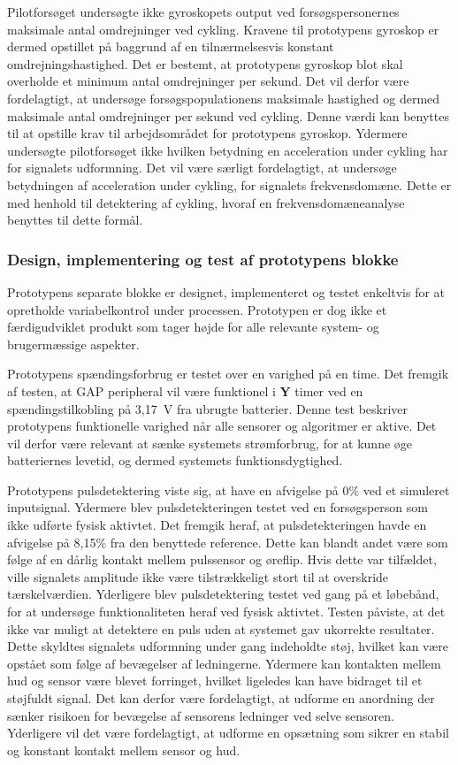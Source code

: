 Pilotforsøget undersøgte ikke gyroskopets output ved forsøgspersonernes maksimale antal omdrejninger ved cykling. Kravene til prototypens gyroskop er dermed opstillet på baggrund af en tilnærmelsesvis konstant omdrejningshastighed. Det er bestemt, at prototypens gyroskop blot skal overholde et minimum antal omdrejninger per sekund. Det vil derfor være fordelagtigt, at undersøge forsøgspopulationens maksimale hastighed og dermed maksimale antal omdrejninger per sekund ved cykling. Denne værdi kan benyttes til at opstille krav til arbejdsområdet for prototypens gyroskop.
Ydermere undersøgte pilotforsøget ikke hvilken betydning en acceleration under cykling har for signalets udformning. Det vil være særligt fordelagtigt, at undersøge betydningen af acceleration under cykling, for signalets frekvensdomæne. Dette er med henhold til detektering af cykling, hvoraf en frekvensdomæneanalyse benyttes til dette formål.

\subsubsection{Design, implementering og test af prototypens blokke}
Prototypens separate blokke er designet, implementeret og testet enkeltvis for at opretholde variabelkontrol under processen. Prototypen er dog ikke et færdigudviklet produkt som tager højde for alle relevante system- og brugermæssige aspekter.

Prototypens spændingsforbrug er testet over en varighed på en time. Det fremgik af testen, at GAP peripheral vil være funktionel i \textbf{Y} timer ved en spændingstilkobling på 3,17~V fra ubrugte batterier. Denne test beskriver prototypens funktionelle varighed når alle sensorer og algoritmer er aktive. Det vil derfor være relevant at sænke systemets strømforbrug, for at kunne øge batteriernes levetid, og dermed systemets funktionsdygtighed.

Prototypens pulsdetektering viste sig, at have en afvigelse på 0\% ved et simuleret inputsignal. Ydermere blev pulsdetekteringen testet ved en forsøgsperson som ikke udførte fysisk aktivtet. Det fremgik heraf, at pulsdetekteringen havde en afvigelse på 8,15\% fra den benyttede reference. Dette kan blandt andet være som følge af en dårlig kontakt mellem pulssensor og øreflip. Hvis dette var tilfældet, ville signalets amplitude ikke være tilstrækkeligt stort til at overskride tærskelværdien. Yderligere blev pulsdetektering testet ved gang på et løbebånd, for at undersøge funktionaliteten heraf ved fysisk aktivtet. Testen påviste, at det ikke var muligt at detektere en puls uden at systemet gav ukorrekte resultater. Dette skyldtes signalets udformning under gang indeholdte støj, hvilket kan være opstået som følge af bevægelser af ledningerne. Ydermere kan kontakten mellem hud og sensor være blevet forringet, hvilket ligeledes kan have bidraget til et støjfuldt signal. Det kan derfor være fordelagtigt, at udforme en anordning der sænker risikoen for bevægelse af sensorens ledninger ved selve sensoren. Yderligere vil det være fordelagtigt, at udforme en opsætning som sikrer en stabil og konstant kontakt mellem sensor og hud.

